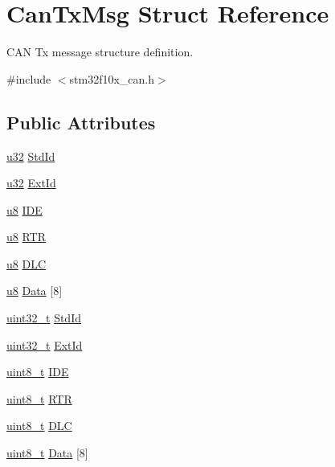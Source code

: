 \hypertarget{struct_can_tx_msg}{}\section{Can\+Tx\+Msg Struct Reference}
\label{struct_can_tx_msg}


C\+AN Tx message structure definition.  




{\ttfamily \#include $<$stm32f10x\+\_\+can.\+h$>$}

\subsection*{Public Attributes}
\begin{DoxyCompactItemize}
\item 
\hyperlink{agilefox_2library_2inc_2stm32f10x__type_8h_a2caf5cd7bcdbe1eefa727f44ffb10bac}{u32} \hyperlink{struct_can_tx_msg_ade3f168458a60e14e912b863e84c6dcb}{Std\+Id}
\item 
\hyperlink{agilefox_2library_2inc_2stm32f10x__type_8h_a2caf5cd7bcdbe1eefa727f44ffb10bac}{u32} \hyperlink{struct_can_tx_msg_a21eb90876a125cc6f5db3ae0cdb4138e}{Ext\+Id}
\item 
\hyperlink{agilefox_2library_2inc_2stm32f10x__type_8h_aed742c436da53c1080638ce6ef7d13de}{u8} \hyperlink{struct_can_tx_msg_ae25ec4c40275e74e716712877f3af3e1}{I\+DE}
\item 
\hyperlink{agilefox_2library_2inc_2stm32f10x__type_8h_aed742c436da53c1080638ce6ef7d13de}{u8} \hyperlink{struct_can_tx_msg_a34fa45f54662c61785a06cf5294ffbb5}{R\+TR}
\item 
\hyperlink{agilefox_2library_2inc_2stm32f10x__type_8h_aed742c436da53c1080638ce6ef7d13de}{u8} \hyperlink{struct_can_tx_msg_a3cf1c0e8d68447b817e007e7c9057441}{D\+LC}
\item 
\hyperlink{agilefox_2library_2inc_2stm32f10x__type_8h_aed742c436da53c1080638ce6ef7d13de}{u8} \hyperlink{struct_can_tx_msg_a177a3a7e7e5fe75540b9906732bda98c}{Data} \mbox{[}8\mbox{]}
\item 
\hyperlink{_p_e___types_8h_a33594304e786b158f3fb30289278f5af}{uint32\+\_\+t} \hyperlink{struct_can_tx_msg_abfb50c8208227f8cf378f29cf9a3a6f3}{Std\+Id}
\item 
\hyperlink{_p_e___types_8h_a33594304e786b158f3fb30289278f5af}{uint32\+\_\+t} \hyperlink{struct_can_tx_msg_a33050a95a4cc463b589ff16bdd416f22}{Ext\+Id}
\item 
\hyperlink{_p_e___types_8h_aba7bc1797add20fe3efdf37ced1182c5}{uint8\+\_\+t} \hyperlink{struct_can_tx_msg_aa4c8568a0e3250a17bd7e116b3e09670}{I\+DE}
\item 
\hyperlink{_p_e___types_8h_aba7bc1797add20fe3efdf37ced1182c5}{uint8\+\_\+t} \hyperlink{struct_can_tx_msg_a69f84255db38c6910058f290efdb7302}{R\+TR}
\item 
\hyperlink{_p_e___types_8h_aba7bc1797add20fe3efdf37ced1182c5}{uint8\+\_\+t} \hyperlink{struct_can_tx_msg_ab49d0fa602aad2fd9cd007adafc11fc2}{D\+LC}
\item 
\hyperlink{_p_e___types_8h_aba7bc1797add20fe3efdf37ced1182c5}{uint8\+\_\+t} \hyperlink{struct_can_tx_msg_aabfbf718f627da26d9e3cf903dc0ad02}{Data} \mbox{[}8\mbox{]}
\end{DoxyCompactItemize}


